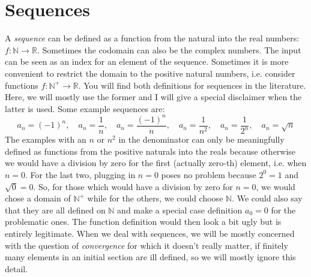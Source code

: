 \section{Sequences}

A \emph{sequence} can be defined as a function from the natural into the real numbers: $f: \mathbb{N} \rightarrow \mathbb{R}$. Sometimes the codomain can also be the complex numbers. The input can be seen as an index for an element of the sequence. Sometimes it is more convenient to restrict the domain to the positive natural numbers, i.e. consider functions $f: \mathbb{N}^+ \rightarrow \mathbb{R}$. You will find both definitions for sequences in the literature. Here, we will mostly use the former and I will give a special disclaimer when the latter is used. Some example sequences are:
\begin{equation}
 a_n = (-1)^n,           \quad 
 a_n = \frac{1}{n},      \quad
 a_n = \frac{(-1)^n}{n}, \quad 
 a_n = \frac{1}{n^2},    \quad
 a_n = \frac{1}{2^n},    \quad  
 a_n = \sqrt{n}
\end{equation}
The examples with an $n$ or $n^2$ in the denominator can only be meaningfully defined as functions from the positive naturals into the reals because otherwise we would have a division by zero for the first (actually zero-th) element, i.e. when $n=0$. For the last two, plugging in $n=0$ poses no problem because $2^0=1$ and $\sqrt{0} = 0$. So, for those which would have a division by zero for $n=0$, we would chose a domain of $\mathbb{N}^+$ while for the others, we could choose $\mathbb{N}$. We could also say that they are all defined on $\mathbb{N}$ and make a special case definition $a_0 = 0$ for the problematic ones. The function definition would then look a bit ugly but is entirely legitimate. When we deal with sequences, we will be mostly concerned with the question of \emph{convergence} for which it doesn't really matter, if finitely many elements in an initial section are ill defined, so we will mostly ignore this detail. 

